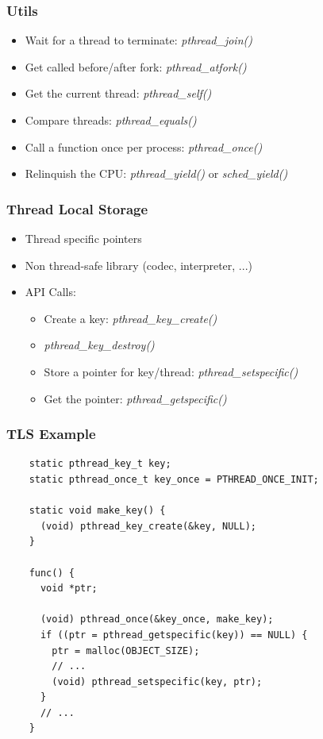 \begin{frame}
  \frametitle{Utils}

  \begin{itemize}
  \item Wait for a thread to terminate: \emph{pthread\_join()}
  \item Get called before/after fork: \emph{pthread\_atfork()}
  \item Get the current thread: \emph{pthread\_self()}
  \item Compare threads: \emph{pthread\_equals()}
  \item Call a function once per process: \emph{pthread\_once()}
  \item Relinquish the CPU: \emph{pthread\_yield()} or \emph{sched\_yield()}
  \end{itemize}
\end{frame}

\begin{frame}
  \frametitle{Thread Local Storage}

  \begin{itemize}
  \item Thread specific pointers
  \item Non thread-safe library (codec, interpreter, ...)
  \item API Calls:
    \begin{itemize}
    \item Create a key: \emph{pthread\_key\_create()}
    \item \emph{pthread\_key\_destroy()}
    \item Store a pointer for key/thread: \emph{pthread\_setspecific()}
    \item Get the pointer: \emph{pthread\_getspecific()}
    \end{itemize}
  \end{itemize}
\end{frame}

\begin{frame}[fragile]
  \frametitle{TLS Example}

  \begin{verbatim}
    static pthread_key_t key;
    static pthread_once_t key_once = PTHREAD_ONCE_INIT;

    static void make_key() {
      (void) pthread_key_create(&key, NULL);
    }

    func() {
      void *ptr;

      (void) pthread_once(&key_once, make_key);
      if ((ptr = pthread_getspecific(key)) == NULL) {
        ptr = malloc(OBJECT_SIZE);
        // ...
        (void) pthread_setspecific(key, ptr);
      }
      // ...
    }
  \end{verbatim}
\end{frame}




